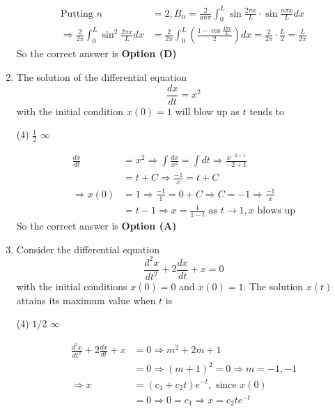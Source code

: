 \begin{enumerate}[label=\color{ocre}\textbf{\arabic*.}]
\begin{answer}
\begin{align*}
		\text{Putting }n&=2, B_{n}=\frac{2}{a n \pi} \int_{0}^{L} \sin \frac{2 \pi x}{L} \cdot \sin \frac{n \pi x}{L} d x\\
		\Rightarrow \frac{2}{2 \pi} \int_{0}^{L} \sin ^{2} \frac{2 \pi x}{L} d x&=\frac{2}{2 \pi} \int_{0}^{L}\left(\frac{1-\cos \frac{4 \pi x}{L}}{2}\right) d x=\frac{2}{2 \pi} \cdot \frac{L}{2}=\frac{L}{2 \pi}
		\end{align*}
		So the correct answer is \textbf{Option (D)}
	\end{answer}
	\item The solution of the differential equation
	$$
	\frac{d x}{d t}=x^{2}
	$$
	with the initial condition $x(0)=1$ will blow up as $t$ tends to
	{}
	\begin{tasks}(4)
		\task[\textbf{C.}] $\frac{1}{2}$
		\task[\textbf{D.}] $\infty$
	\end{tasks}
	\begin{answer}
		\begin{align*}
		\frac{d x}{d t}&=x^{2} \Rightarrow \int \frac{d x}{x^{2}}=\int d t \Rightarrow \frac{x^{-2+1}}{-2+1}\\&=t+C \Rightarrow \frac{-1}{x}=t+C\\
		\Rightarrow x(0)&=1 \Rightarrow \frac{-1}{1}=0+C \Rightarrow C=-1 \Rightarrow \frac{-1}{x}\\&=t-1 \Rightarrow x=\frac{1}{1-t}\text{ as }t \rightarrow 1, x\text{ blows up}
		\end{align*}
		So the correct answer is \textbf{Option (A)}
	\end{answer}
	\item Consider the differential equation
	$$
	\frac{d^{2} x}{d t^{2}}+2 \frac{d x}{d t}+x=0
	$$
	with the initial conditions $x(0)=0$ and $\dot{x}(0)=1$. The solution $x(t)$ attains its maximum value when $t$ is
	{}
	\begin{tasks}(4)
		\task[\textbf{A.}] $1 / 2$
		\task[\textbf{D.}] $\infty$
	\end{tasks}
	\begin{answer}
		\begin{align*}
		\frac{d^{2} x}{d t^{2}}+2 \frac{d x}{d t}+x&=0 \Rightarrow m^{2}+2 m+1\\&=0 \Rightarrow(m+1)^{2}=0 \Rightarrow m=-1,-1\\
		\Rightarrow x&=\left(c_{1}+c_{2} t\right) e^{-t},\text{ since }x(0)\\&=0 \Rightarrow 0=c_{1} \Rightarrow x=c_{2} t e^{-t}\\

\end{align*}
\end{answer}
\end{enumerate}

